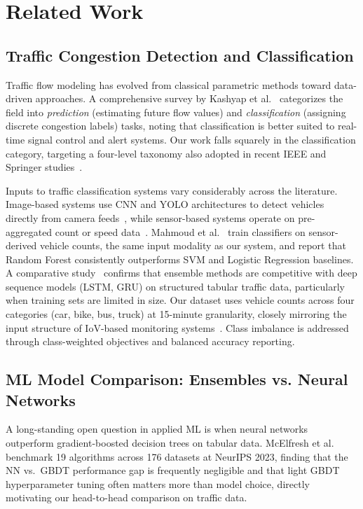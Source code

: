 \documentclass[conference,onecolumn,12pt]{IEEEtran}
\begin{document}
\section{Related Work}
\label{sec:related}

\subsection{Traffic Congestion Detection and Classification}

Traffic flow modeling has evolved from classical parametric methods toward
data-driven approaches. A comprehensive survey by Kashyap et
al.~\cite{kashyap2023} categorizes the field into \emph{prediction}
(estimating future flow values) and \emph{classification} (assigning discrete
congestion labels) tasks, noting that classification is better suited to
real-time signal control and alert systems. Our work falls squarely in the
classification category, targeting a four-level taxonomy also adopted in recent
IEEE and Springer studies~\cite{mahmoud2024,sharma2024}.

Inputs to traffic classification systems vary considerably across the
literature. Image-based systems use CNN and YOLO architectures to detect
vehicles directly from camera feeds~\cite{chen2025}, while sensor-based
systems operate on pre-aggregated count or speed data~\cite{mahmoud2024}.
Mahmoud et al.~\cite{mahmoud2024} train classifiers on sensor-derived vehicle
counts, the same input modality as our system, and report that Random Forest
consistently outperforms SVM and Logistic Regression baselines. A comparative
study~\cite{sharma2024} confirms that ensemble methods are competitive with
deep sequence models (LSTM, GRU) on structured tabular traffic data,
particularly when training sets are limited in size. Our dataset uses vehicle
counts across four categories (car, bike, bus, truck) at 15-minute
granularity, closely mirroring the input structure of IoV-based monitoring
systems~\cite{ali2021}. Class imbalance is addressed through class-weighted
objectives and balanced accuracy reporting.

\subsection{ML Model Comparison: Ensembles vs. Neural Networks}

A long-standing open question in applied ML is when neural networks outperform
gradient-boosted decision trees on tabular data. McElfresh et
al.~\cite{mcelfresh2023} benchmark 19 algorithms across 176 datasets at
NeurIPS 2023, finding that the NN vs.\ GBDT performance gap is frequently
negligible and that light GBDT hyperparameter tuning often matters more than
model choice, directly motivating our head-to-head comparison on traffic
data.
\end{document}
